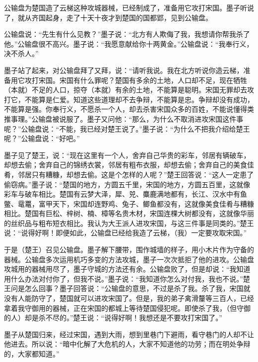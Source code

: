 \documentclass[12pt,UTF-8,openany]{ctexbook}
\begin{document}
\begin{normalsize}
    
    公输盘为楚国造了云梯这种攻城器械，已经制成了，准备用它攻打宋国。墨子听说了，就从齐国起身，走了十天十夜才到楚国的国都郢，见到公输盘。
    
    公输盘说：“先生有什么见教？”墨子说：“北方有人欺侮了我，我想请你帮我杀了他。”公输盘很不高兴。墨子说：“我愿意献给你十两黄金。”公输盘说：“我奉行义，决不杀人。”
    
    墨子站了起来，对公输盘拜了又拜，说：“请听我说。我在北方听说你造云梯，准备用它攻打宋国。宋国有什么罪呢？楚国有多余的土地，人口却不足，现在牺牲（本就）不足的人口，掠夺（本就）有余的土地，不能算是聪明。宋国无罪却去攻打它，不能算是仁爱。知道这些道理却不去争辩，不能算是忠。争辩却没有成功，不能算是强。你奉行义，不愿杀一个人，却去杀害宋国众多的百姓，不能说懂得类推事理。”公输盘被说服了。墨子又问他：“那么，为什么不取消进攻宋国这件事呢？”公输盘说：“不能，我已经对楚王说了。”墨子说：“为什么不把我介绍给楚王呢？”公输盘说：“好吧。”
    
    墨子见了楚王，说：“现在这里有一个人，舍弃自己华贵的彩车，邻居有辆破车，却想去偷；舍弃自己的锦绣衣裳，邻居有粗布衣服，却想去偷；舍弃自己的美食佳肴，邻居只有糟糠，却想去偷。这是个怎样的人呢？”楚王回答说：“这人一定患了偷窃病。”墨子说：“楚国的地方，方圆五千里，宋国的地方，方圆五百里，这就像彩车与破车相比。楚国有云梦大泽，犀、兕、麋鹿满地都有，长江、汉水中有鱼鳖、鼋鼍，富甲天下，宋国却连野鸡、兔子、鲫鱼都没有，这就像美食佳肴与糟糠相比。楚国有巨松、梓树、楠、樟等名贵木材，宋国连棵大树都没有，这就像华丽的丝织品与粗布短衣相比。我认为大王派人进攻宋国，与这三件事是同类的。”楚王说：“说得好啊！即便如此，公输盘已经给我造了云梯，（我）一定要攻取宋国。”
    
    于是（楚王）召见公输盘。墨子解下腰带，围作城墙的样子，用小木片作为守备的器械。公输盘多次运用机巧多变的方法攻城，墨子一次次抵拒了他的进攻。公输盘攻城用的器械用尽了，墨子守城的方法还有余。公输盘败了，但是却说：“我知道用什么办法对付你了，但我不说。”墨子说：“我知道你怎么对付我，我也不说。”楚王问是怎么回事？墨子回答说：“公输盘的意思，不过是杀了我。杀了我，宋国就没有人能防守了，楚国就可以进攻宋国了。但是，我的弟子禽滑釐等三百人，已经拿着我守御用的器械，正在宋国的都城上等待楚国侵犯呢。即使杀了我，（但守御的人）却是杀不尽的。”楚王说：“说得好啊！我想还是不要攻打宋国了。”
    
    墨子从楚国归来，经过宋国，遇到大雨，想到里巷门下避雨，看守巷门的人却不让他进去。所以说：“暗中化解了大危机的人，大家不知道他的功劳；而在明处争辩的，大家都知道。”
    
\end{normalsize}
\end{document}
